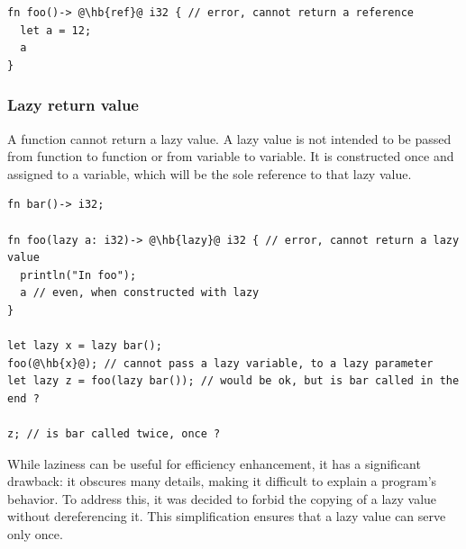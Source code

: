 \begin{lstlisting}[style=coloredverbatimError, escapechar=@]
fn foo()-> @\hb{ref}@ i32 { // error, cannot return a reference
  let a = 12;
  a
}
\end{lstlisting}

\subsubsection*{Lazy return value}
\label{sec:lazy_return}

A function cannot return a lazy value. A lazy value is not intended to be passed
from function to function or from variable to variable. It is constructed once
and assigned to a variable, which will be the sole reference to that lazy value.

\begin{lstlisting}[style=coloredverbatim, escapechar=@
]fn bar()-> i32;

fn foo(lazy a: i32)-> @\hb{lazy}@ i32 { // error, cannot return a lazy value
  println("In foo");
  a // even, when constructed with lazy
}

let lazy x = lazy bar();
foo(@\hb{x}@); // cannot pass a lazy variable, to a lazy parameter
let lazy z = foo(lazy bar()); // would be ok, but is bar called in the end ?

z; // is bar called twice, once ?
\end{lstlisting}

While laziness can be useful for efficiency enhancement, it has a significant
drawback: it obscures many details, making it difficult to explain a program's
behavior. To address this, it was decided to forbid the copying of a lazy value
without dereferencing it. This simplification ensures that a lazy value can
serve only once.
